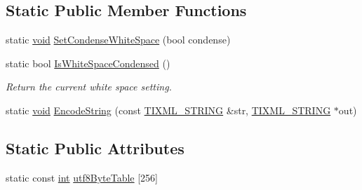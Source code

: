 \subsection*{Static Public Member Functions}
\begin{DoxyCompactItemize}
\item 
static \hyperlink{wglew_8h_aeea6e3dfae3acf232096f57d2d57f084}{void} \hyperlink{class_ti_xml_base_a0f799ec645bfb8d8a969e83478f379c1}{Set\-Condense\-White\-Space} (bool condense)
\item 
static bool \hyperlink{class_ti_xml_base_ad4b1472531c647a25b1840a87ae42438}{Is\-White\-Space\-Condensed} ()
\begin{DoxyCompactList}\small\item\em Return the current white space setting. \end{DoxyCompactList}\item 
static \hyperlink{wglew_8h_aeea6e3dfae3acf232096f57d2d57f084}{void} \hyperlink{class_ti_xml_base_a6bd8c315c1acb09e34107b8736505948}{Encode\-String} (const \hyperlink{tinyxml_8h_a92bada05fd84d9a0c9a5bbe53de26887}{T\-I\-X\-M\-L\-\_\-\-S\-T\-R\-I\-N\-G} \&str, \hyperlink{tinyxml_8h_a92bada05fd84d9a0c9a5bbe53de26887}{T\-I\-X\-M\-L\-\_\-\-S\-T\-R\-I\-N\-G} $\ast$out)
\end{DoxyCompactItemize}
\subsection*{Static Public Attributes}
\begin{DoxyCompactItemize}
\item 
static const \hyperlink{wglew_8h_a500a82aecba06f4550f6849b8099ca21}{int} \hyperlink{class_ti_xml_base_a727583b4ed4342a3ad78cdc39b819af4}{utf8\-Byte\-Table} \mbox{[}256\mbox{]}
\end{DoxyCompactItemize}
